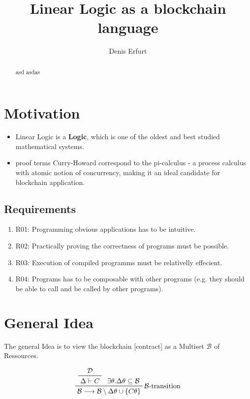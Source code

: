 \documentclass[sigconf]{acmart}
\begin{document}
\title{Linear Logic as a blockchain language}
\author{Denis Erfurt}

\begin{abstract}
  asd asdas
\end{abstract}

\maketitle

\section{Motivation}

\begin{itemize}
  \item Linear Logic is a \textbf{Logic}, which is one of the oldest and best studied mathematical systems.
  \item proof terms Curry-Howard correspond to the pi-calculus - a process calculus with atomic notion of concurrency, making it an ideal candidate for blockchain application.
\end{itemize}

\subsection{Requirements}

\begin{enumerate}
  \item R01: Programming obvious applications has to be intuitive.
  \item R02: Practically proving the correctness of programs must be possible.
  \item R03: Execution of compiled programms must be relativelly effecient.
  \item R04: Programs has to be composable with other programs (e.g. they should be able to call and be called by other programs).
\end{enumerate}

\section{General Idea}

The general Idea is to view the blockchain [contract] as a Multiset $\mathcal{B}$ of Ressources.

\begin{equation}
  \prftree[r]
  {$\mathcal{B}$-transition}
  {
    \prftree
    {
      \mathcal{D}
    } {
      \Delta\vdash C
    }
  }
  {\exists\theta.\Delta\theta\subseteq\mathcal{B}}
  {\mathcal{B}\longrightarrow\mathcal{B}\setminus\Delta\theta\cup\{C\theta\}}
\end{equation}
\end{document}
